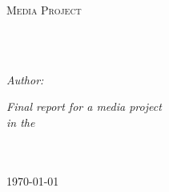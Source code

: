 \documentclass[
11pt, %
english, %
singlespacing, %
headsepline, %
]{mediaproject} %
\author{Christon-Ragavan Nadar and Shivam Sani} %
\begin{document}
\frontmatter %

\pagestyle{plain} %


\begin{titlepage}
\begin{center}

\vspace*{.06\textheight}
{\scshape\LARGE \univname\par}\vspace{1.5cm} %
\textsc{\Large Media Project}\\[0.5cm] %

\HRule \\[0.4cm] %
{\huge \bfseries \ttitle\par}\vspace{0.4cm}  %
\HRule \\[1.5cm] %
 


\begin{minipage}[t]{\textwidth}
        \centering
        \emph{Author:}\\
        \href{http://www.christonragavan.com}{\authorname} %

\end{minipage}


\vspace*{.06\textheight}


\large \textit{Final report for a media project}\\[0.3cm] %
\textit{in the}\\[0.4cm]
\groupname\\\deptname\\[2cm] %
 
\vfill

{\large \today}\\[4cm] %
 

\end{center}
\end{titlepage}
\end{document}
